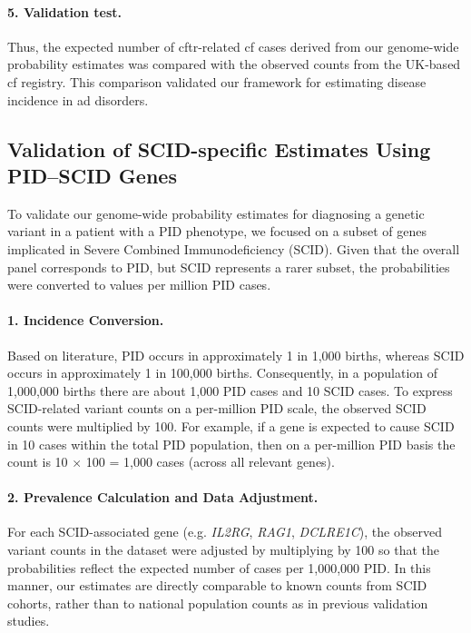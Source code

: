 \paragraph{5. Validation test.}
Thus, the expected number of \ac{cftr}-related \ac{cf} cases derived from our genome-wide probability estimates was compared with the observed counts from the UK-based \ac{cf} registry. This comparison validated our framework for estimating disease incidence in \ac{ad} disorders.


\subsection{Validation of SCID-specific Estimates Using PID–SCID Genes}

To validate our genome-wide probability estimates for diagnosing a genetic variant in a patient with a PID phenotype, we focused on a subset of genes implicated in Severe Combined Immunodeficiency (SCID). Given that the overall panel corresponds to PID, but SCID represents a rarer subset, the probabilities were converted to values per million PID cases.

\paragraph{1. Incidence Conversion.}
Based on literature, PID occurs in approximately 1 in 1,000 births, whereas SCID occurs in approximately 1 in 100,000 births. Consequently, in a population of 1,000,000 births there are about 1,000 PID cases and 10 SCID cases. To express SCID-related variant counts on a per-million PID scale, the observed SCID counts were multiplied by 100. For example, if a gene is expected to cause SCID in 10 cases within the total PID population, then on a per-million PID basis the count is 10 × 100 = 1,000 cases (across all relevant genes).

\paragraph{2. Prevalence Calculation and Data Adjustment.}
For each SCID-associated gene (e.g. \textit{IL2RG}, \textit{RAG1}, \textit{DCLRE1C}), the observed variant counts in the dataset were adjusted by multiplying by 100 so that the probabilities reflect the expected number of cases per 1,000,000 PID. In this manner, our estimates are directly comparable to known counts from SCID cohorts, rather than to national population counts as in previous validation studies.


